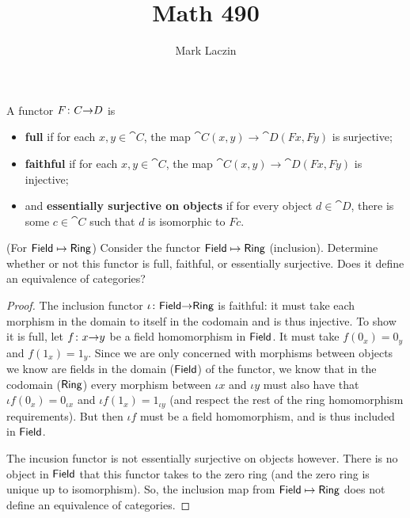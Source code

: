 \documentclass{article}
\title{Math 490}
\author{Mark Laczin}
\begin{document}
\maketitle

\begin{definition}
	A functor ${F}\colon{C}{\to}{D}$ is
	\begin{itemize}
		\item \textbf{full} if for each $x,y\in \cat{C}$, the map $\cat{C}(x,y)\rightarrow\cat{D}(Fx,Fy)$ is surjective;
		\item \textbf{faithful} if for each $x,y\in \cat{C}$, the map $\cat{C}(x,y)\rightarrow\cat{D}(Fx,Fy)$ is injective;
		\item and \textbf{essentially surjective on objects} if for every object $d\in\cat{D}$, there is some $c\in\cat{C}$ such that $d$ is isomorphic to $Fc$.
	\end{itemize}
\end{definition}

\begin{exercise}(For $\textsf{Field}\mapsto\textsf{Ring}$)
	Consider the functor $\textsf{Field}\mapsto\textsf{Ring}$ (inclusion). Determine whether or not this functor is full, faithful, or essentially surjective. Does it define an equivalence of categories?
\end{exercise}

\begin{proof}
	The inclusion functor ${\iota}\colon{\textsf{Field}}{\to}{\textsf{Ring}}$ is faithful: it must take each morphism in the domain to itself in the codomain and is thus injective. To show it is full, let ${f}\colon{x}{\to}{y}$ be a field homomorphism in $\textsf{Field}$. It must take $f(0_x)=0_y$ and $f(1_x)=1_y$. Since we are only concerned with morphisms between objects we know are fields in the domain ($\textsf{Field}$) of the functor, we know that in the codomain ($\textsf{Ring}$) every morphism between $\iota x$ and $\iota y$ must also have that $\iota f(0_x) = 0_{\iota x}$ and $\iota f(1_x) = 1_{\iota y}$ (and respect the rest of the ring homomorphism requirements). But then $\iota f$ must be a field homomorphism, and is thus included in $\textsf{Field}$.
	
	The incusion functor is not essentially surjective on objects however. There is no object in $\textsf{Field}$ that this functor takes to the zero ring (and the zero ring is unique up to isomorphism). So, the inclusion map from $\textsf{Field}\mapsto\textsf{Ring}$ does not define an equivalence of categories.
\end{proof}
\end{document}
